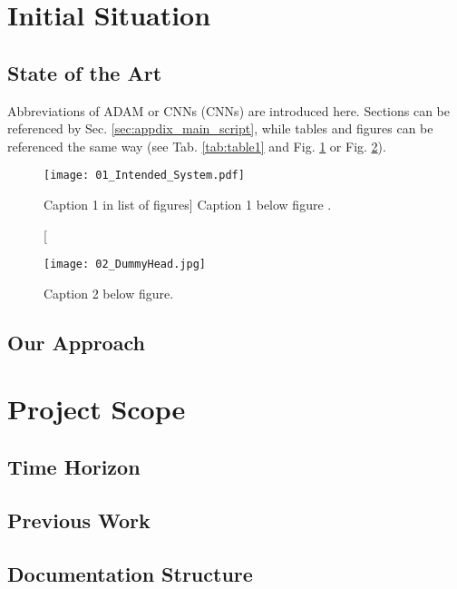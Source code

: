 
        
\section{Initial Situation}

\subsection{State of the Art} 
Abbreviations of \ac{ADAM} or \aclp{CNN} (\acsp{CNN}) are introduced here. Sections can be referenced by Sec. \ref{sec:appdix_main_script}, while tables and figures can be referenced the same way (see Tab. \ref{tab:table1} and Fig. \ref{fig:figure1} or Fig. \ref{fig:figure2}).

\begin{figure}[htb!]
 \centering
 \texttt{[image: 01\_Intended\_System.pdf]}
 \caption
 [Caption 1 in list of figures]
 {Caption 1 below figure \cite{axodraw}.}
 \label{fig:figure1}
\end{figure}

\begin{figure}[htb!]
 \centering
 \texttt{[image: 02\_DummyHead.jpg]}
 \caption{Caption 2 below figure.}
 \label{fig:figure2}
\end{figure}

\subsection{Our Approach}


\newpage
\section{Project Scope}

\subsection{Time Horizon}

\subsection{Previous Work}

\subsection{Documentation Structure}
